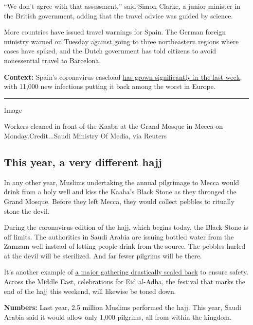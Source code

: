 ``We don't agree with that assessment,'' said Simon Clarke, a junior
minister in the British government, adding that the travel advice was
guided by science.

More countries have issued travel warnings for Spain. The German foreign
ministry warned on Tuesday against going to three northeastern regions
where cases have spiked, and the Dutch government has told citizens to
avoid nonessential travel to Barcelona.

\textbf{Context:} Spain's coronavirus caseload
\href{https://www.nytimes.com/2020/07/23/world/europe/spain-coronavirus-reopening.html}{has
grown significantly in the last week}, with 11,000 new infections
putting it back among the worst in Europe.

\begin{center}\rule{0.5\linewidth}{\linethickness}\end{center}

Image

Workers cleaned in front of the Kaaba at the Grand Mosque in Mecca on
Monday.Credit...Saudi Ministry Of Media, via Reuters

\hypertarget{this-year-a-very-different-hajj}{%
\subsection{This year, a very different
hajj}\label{this-year-a-very-different-hajj}}

In any other year, Muslims undertaking the annual pilgrimage to Mecca
would drink from a holy well and kiss the Kaaba's Black Stone as they
thronged the Grand Mosque. Before they left Mecca, they would collect
pebbles to ritually stone the devil.

During the coronavirus edition of the hajj, which begins today, the
Black Stone is off limits. The authorities in Saudi Arabia are issuing
bottled water from the Zamzam well instead of letting people drink from
the source. The pebbles hurled at the devil will be sterilized. And far
fewer pilgrims will be there.

It's another example of
\href{https://www.nytimes.com/2020/07/28/world/coronavirus-covid-19.html\#link-3fa8e195}{a
major gathering drastically scaled back} to ensure safety. Across the
Middle East, celebrations for Eid al-Adha, the festival that marks the
end of the hajj this weekend, will likewise be toned down.

\textbf{Numbers:} Last year, 2.5 million Muslims performed the hajj.
This year, Saudi Arabia said it would allow only 1,000 pilgrims, all
from within the kingdom.

